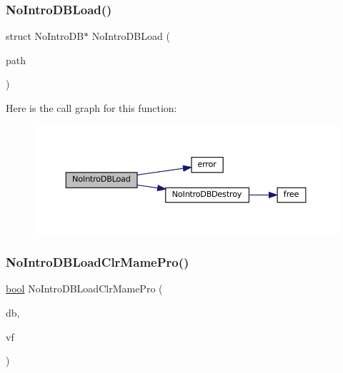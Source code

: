 \subsubsection{\texorpdfstring{No\+Intro\+D\+B\+Load()}{NoIntroDBLoad()}}
{\footnotesize\ttfamily struct No\+Intro\+DB$\ast$ No\+Intro\+D\+B\+Load (\begin{DoxyParamCaption}\item[{const char $\ast$}]{path }\end{DoxyParamCaption})}

Here is the call graph for this function\+:
\nopagebreak
\begin{figure}[H]
\begin{center}
\leavevmode
\includegraphics[width=350pt]{no-intro_8h_a467dbcef29eb2a06f7b5747e6ee4fddb_cgraph}
\end{center}
\end{figure}
\mbox{\label{no-intro_8h_a0ce34503c62adbfd6accf09a9ce89260}} 
\subsubsection{\texorpdfstring{No\+Intro\+D\+B\+Load\+Clr\+Mame\+Pro()}{NoIntroDBLoadClrMamePro()}}
{\footnotesize\ttfamily \mbox{\hyperlink{libretro_8h_a4a26dcae73fb7e1528214a068aca317e}{bool}} No\+Intro\+D\+B\+Load\+Clr\+Mame\+Pro (\begin{DoxyParamCaption}\item[{struct No\+Intro\+DB $\ast$}]{db,  }\item[{struct V\+File $\ast$}]{vf }\end{DoxyParamCaption})}

